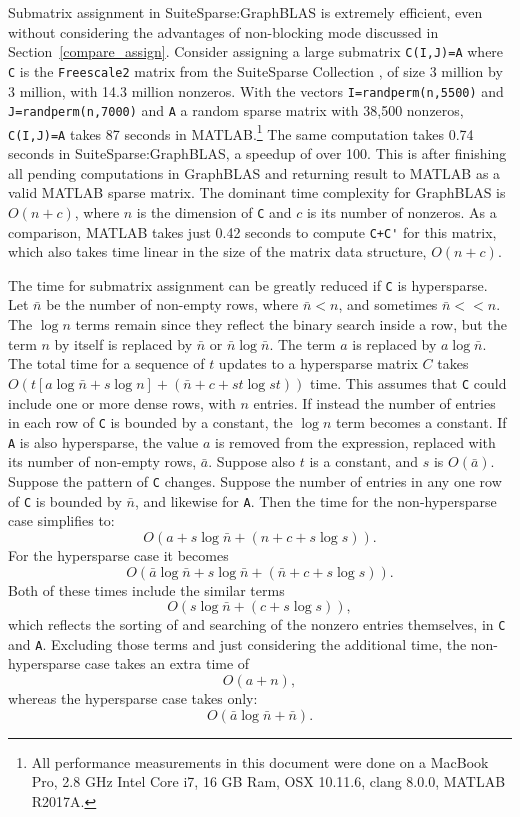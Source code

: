 \documentclass[12pt]{article}
\begin{document}
Submatrix assignment in SuiteSparse:GraphBLAS is extremely efficient, even
without considering the advantages of non-blocking mode discussed in
Section~\ref{compare_assign}.  Consider assigning a large submatrix
\verb'C(I,J)=A' where \verb'C' is the \verb'Freescale2' matrix from the
SuiteSparse Collection \cite{DavisHu11}, of size 3 million by 3 million, with
14.3 million nonzeros.  With the vectors \verb'I=randperm(n,5500)' and
\verb'J=randperm(n,7000)' and \verb'A' a random sparse matrix with 38,500
nonzeros, \verb'C(I,J)=A' takes 87 seconds in MATLAB.\footnote{All performance
measurements in this document were done on a  MacBook Pro, 2.8 GHz Intel Core
i7, 16 GB Ram, OSX 10.11.6, clang 8.0.0, MATLAB R2017A.} The same computation
takes 0.74 seconds in SuiteSparse:GraphBLAS, a speedup of over 100.  This is
after finishing all pending computations in GraphBLAS and returning result to
MATLAB as a valid MATLAB sparse matrix.  The dominant time complexity for
GraphBLAS is $O(n+c)$, where $n$ is the dimension of \verb'C' and $c$ is its
number of nonzeros.  As a comparison, MATLAB takes just 0.42 seconds to compute
\verb"C+C'" for this matrix, which also takes time linear in the size of the
matrix data structure, $O(n+c)$.

The time for submatrix assignment can be greatly reduced if \verb'C' is
hypersparse.  Let $\bar{n}$ be the number of non-empty rows, where $\bar{n}<n$,
and sometimes $\bar{n} << n$.  The $\log n$ terms remain since they reflect the
binary search inside a row, but the term $n$ by itself is replaced by
$\bar{n}$ or $\bar{n} \log \bar{n}$.  The term $a$ is replaced by $a \log
\bar{n}$.  The total time for a sequence of $t$ updates to a hypersparse matrix
$C$ takes $O (t \left [a \log \bar{n} + s \log n \right] + (\bar{n} + c + st
\log st))$ time.  This assumes that \verb'C' could include one or more dense
rows, with $n$ entries.  If instead the number of entries in each row of
\verb'C' is bounded by a constant, the $\log n$ term becomes a constant.  If
\verb'A' is also hypersparse, the value $a$ is removed from the expression,
replaced with its number of non-empty rows, $\bar{a}$.  Suppose also $t$ is
a constant, and $s$ is $O(\bar{a})$.  Suppose the pattern of \verb'C' changes.
Suppose the number of entries in any one row of \verb'C' is bounded by
$\bar{n}$, and likewise for \verb'A'.  Then the time for the non-hypersparse
case simplifies to:
\[ O ( a                    + s \log \bar{n} + (n       + c + s \log s)). \]
For the hypersparse case it becomes
\[ O ( \bar{a} \log \bar{n} + s \log \bar{n} + (\bar{n} + c + s \log s)). \]
Both of these times include the similar terms
\[ O (                        s \log \bar{n} + (          c + s \log s)), \]
which reflects the sorting of and searching of the nonzero entries themselves,
in \verb'C' and \verb'A'.
Excluding those terms and just considering the additional time,
the non-hypersparse case takes an extra time of
\[ O ( a                    +                   n                      ), \]
whereas the hypersparse case takes only:
\[ O ( \bar{a} \log \bar{n} +                   \bar{n}                ). \]
\end{document}
